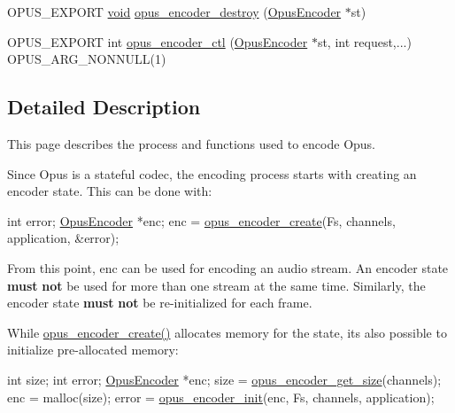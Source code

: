 \begin{DoxyCompactItemize}
\item 
O\+P\+U\+S\+\_\+\+E\+X\+P\+O\+RT \hyperlink{png_8h_ac9c84fa68bbad002983e35ce3663c686}{void} \hyperlink{group__opus__encoder_ga899c69582a1cad2a168aedc99cab7be0}{opus\+\_\+encoder\+\_\+destroy} (\hyperlink{group__opus__encoder_gaf461a3ef2f10c2fe8b994a176f06c9bd}{Opus\+Encoder} $\ast$st)
\item 
O\+P\+U\+S\+\_\+\+E\+X\+P\+O\+RT int \hyperlink{group__opus__encoder_ga88cb327d8f7d6a96c7d2d0b8461512e6}{opus\+\_\+encoder\+\_\+ctl} (\hyperlink{group__opus__encoder_gaf461a3ef2f10c2fe8b994a176f06c9bd}{Opus\+Encoder} $\ast$st, int request,...) O\+P\+U\+S\+\_\+\+A\+R\+G\+\_\+\+N\+O\+N\+N\+U\+LL(1)
\end{DoxyCompactItemize}


\subsection{Detailed Description}
This page describes the process and functions used to encode Opus. 

Since Opus is a stateful codec, the encoding process starts with creating an encoder state. This can be done with\+:


\begin{DoxyCode}
\textcolor{keywordtype}{int}          error;
\hyperlink{group__opus__encoder_gaf461a3ef2f10c2fe8b994a176f06c9bd}{OpusEncoder} *enc;
enc = \hyperlink{group__opus__encoder_ga8a145618886fed2d6fbc79a4071a939d}{opus\_encoder\_create}(Fs, channels, application, &error);
\end{DoxyCode}


From this point, {\ttfamily enc} can be used for encoding an audio stream. An encoder state {\bfseries must} {\bfseries not} be used for more than one stream at the same time. Similarly, the encoder state {\bfseries must} {\bfseries not} be re-\/initialized for each frame.

While \hyperlink{group__opus__encoder_ga8a145618886fed2d6fbc79a4071a939d}{opus\+\_\+encoder\+\_\+create()} allocates memory for the state, it\textquotesingle{}s also possible to initialize pre-\/allocated memory\+:


\begin{DoxyCode}
\textcolor{keywordtype}{int}          size;
\textcolor{keywordtype}{int}          error;
\hyperlink{group__opus__encoder_gaf461a3ef2f10c2fe8b994a176f06c9bd}{OpusEncoder} *enc;
size = \hyperlink{group__opus__encoder_ga9ac72d062eca0c77711f5b04b9dcc645}{opus\_encoder\_get\_size}(channels);
enc = malloc(size);
error = \hyperlink{group__opus__encoder_ga363e90db0f434b2d8fde7dcf989270b1}{opus\_encoder\_init}(enc, Fs, channels, application);
\end{DoxyCode}


